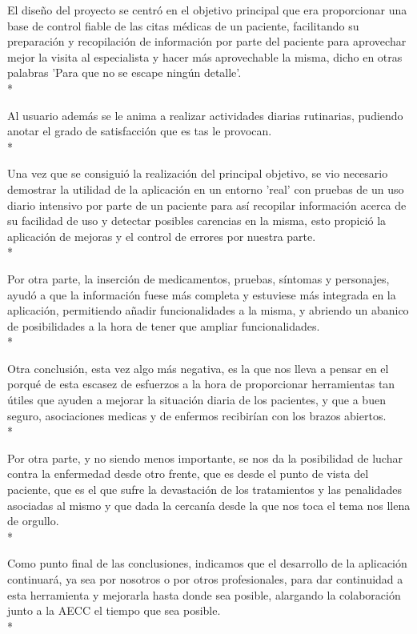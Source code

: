 \documentclass[../pfc.tex]{subfiles}
\begin{document}
	El diseño del proyecto se centró en el objetivo principal que era proporcionar una base de control fiable de las citas médicas de un paciente, facilitando su preparación y recopilación de información por parte del paciente para aprovechar mejor la visita al especialista y hacer más aprovechable la misma, dicho en otras palabras 'Para que no se escape ningún detalle'.\\*
	
	Al usuario además se le anima a realizar actividades diarias rutinarias, pudiendo anotar el grado de satisfacción que es tas le provocan.\\*
	
	Una vez que se consiguió la realización del principal objetivo, se vio necesario demostrar la utilidad de la aplicación en un entorno 'real' con pruebas de un uso diario intensivo por parte de un paciente para así recopilar información acerca de su facilidad de uso y detectar posibles carencias en la misma, esto propició la aplicación de mejoras y el control de errores por nuestra parte.\\*
	
	Por otra parte, la inserción de medicamentos, pruebas, síntomas y personajes, ayudó a que la información fuese más completa y estuviese más integrada en la aplicación, permitiendo añadir funcionalidades a la misma, y abriendo un abanico de posibilidades a la hora de tener que ampliar funcionalidades.\\*
		
	Otra conclusión, esta vez algo más negativa, es la que nos lleva a pensar en el porqué de esta escasez de esfuerzos a la hora de proporcionar herramientas tan útiles que ayuden a mejorar la situación diaria de los pacientes, y que a buen seguro, asociaciones medicas y de enfermos recibirían con los brazos abiertos.\\*
	 
		
	Por otra parte, y no siendo menos importante, se nos da la posibilidad de luchar contra la enfermedad desde otro frente, que es desde el punto de vista del paciente, que es el que sufre la devastación de los tratamientos y las penalidades asociadas al mismo y que dada la cercanía desde la que nos toca el tema nos llena de orgullo.\\*
	
	Como punto final de las conclusiones, indicamos que el desarrollo de la aplicación continuará, ya sea por nosotros o por otros profesionales, para dar continuidad a esta herramienta y mejorarla hasta donde sea posible, alargando la colaboración junto a la AECC el tiempo que sea posible.\\*
	
\end{document}
